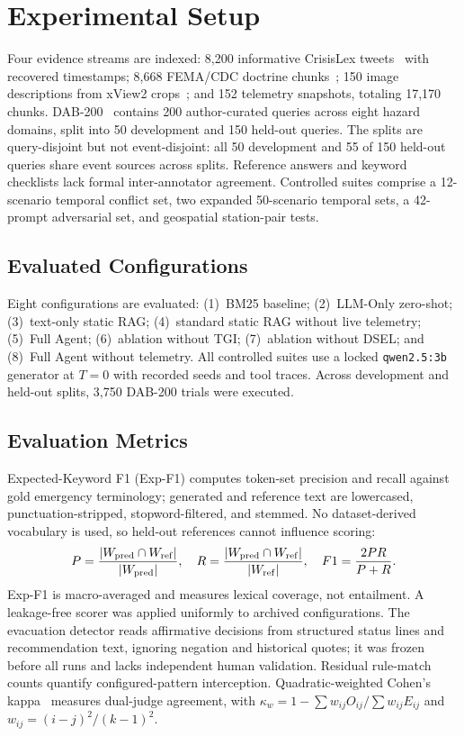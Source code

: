 \documentclass[conference]{IEEEtran}
\begin{document}
\section{Experimental Setup}
Four evidence streams are indexed: 8,200 informative CrisisLex tweets~\cite{olteanu2015} with recovered timestamps; 8,668 FEMA/CDC doctrine chunks~\cite{femanims}; 150 image descriptions from xView2 crops~\cite{xview2}; and 152 telemetry snapshots, totaling 17,170 chunks. DAB-200~\cite{dab200} contains 200 author-curated queries across eight hazard domains, split into 50 development and 150 held-out queries. The splits are query-disjoint but not event-disjoint: all 50 development and 55 of 150 held-out queries share event sources across splits. Reference answers and keyword checklists lack formal inter-annotator agreement. Controlled suites comprise a 12-scenario temporal conflict set, two expanded 50-scenario temporal sets, a 42-prompt adversarial set, and geospatial station-pair tests.

\subsection{Evaluated Configurations}
Eight configurations are evaluated: (1)~BM25 baseline; (2)~LLM-Only zero-shot; (3)~text-only static RAG; (4)~standard static RAG without live telemetry; (5)~Full Agent; (6)~ablation without TGI; (7)~ablation without DSEL; and (8)~Full Agent without telemetry. All controlled suites use a locked \texttt{qwen2.5:3b} generator at $T=0$ with recorded seeds and tool traces. Across development and held-out splits, 3,750 DAB-200 trials were executed.

\subsection{Evaluation Metrics}
Expected-Keyword F1 (Exp-F1) computes token-set precision and recall against gold emergency terminology; generated and reference text are lowercased, punctuation-stripped, stopword-filtered, and stemmed. No dataset-derived vocabulary is used, so held-out references cannot influence scoring:
\begin{equation}
P=\frac{|W_{\rm pred}\cap W_{\rm ref}|}{|W_{\rm pred}|},\quad R=\frac{|W_{\rm pred}\cap W_{\rm ref}|}{|W_{\rm ref}|},\quad F1=\frac{2PR}{P+R}.
\end{equation}
Exp-F1 is macro-averaged and measures lexical coverage, not entailment. A leakage-free scorer was applied uniformly to archived configurations. The evacuation detector reads affirmative decisions from structured status lines and recommendation text, ignoring negation and historical quotes; it was frozen before all runs and lacks independent human validation. Residual rule-match counts quantify configured-pattern interception. Quadratic-weighted Cohen's kappa~\cite{cohen1968,landis1977} measures dual-judge agreement, with $\kappa_w=1-\sum w_{ij}O_{ij}/\sum w_{ij}E_{ij}$ and $w_{ij}=(i-j)^2/(k-1)^2$.
\end{document}
